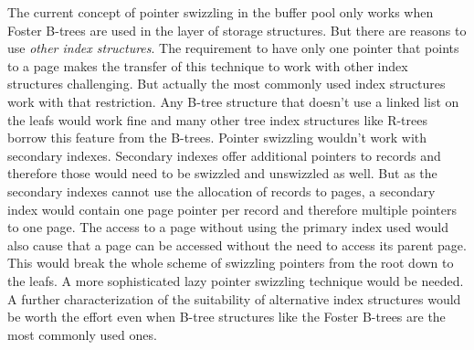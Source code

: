 	The current concept of pointer swizzling in the buffer pool only works when Foster B-trees are used in the layer of storage structures. But there are reasons to use \emph{other index structures}. The requirement to have only one pointer that points to a page makes the transfer of this technique to work with other index structures challenging. But actually the most commonly used index structures work with that restriction. Any B-tree structure that doesn't use a linked list on the leafs would work fine and many other tree index structures like R-trees borrow this feature from the B-trees. Pointer swizzling wouldn't work with secondary indexes. Secondary indexes offer additional pointers to records and therefore those would need to be swizzled and unswizzled as well. But as the secondary indexes cannot use the allocation of records to pages, a secondary index would contain one page pointer per record and therefore multiple pointers to one page. The access to a page without using the primary index used would also cause that a page can be accessed without the need to access its parent page. This would break the whole scheme of swizzling pointers from the root down to the leafs. A more sophisticated lazy pointer swizzling technique would be needed. A further characterization of the suitability of alternative index structures would be worth the effort even when B-tree structures like the Foster B-trees are the most commonly used ones.
		
	